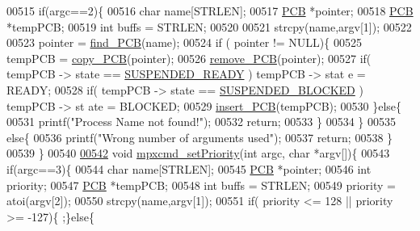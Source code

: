 \begin{DoxyCode}
{{00515         \textcolor{keywordflow}{if}(argc==2)\{
00516                 \textcolor{keywordtype}{char} name[STRLEN];
00517                 \hyperlink{structprocess}{PCB} *pointer;
00518                 \hyperlink{structprocess}{PCB} *tempPCB;
00519                 \textcolor{keywordtype}{int} buffs = STRLEN;
00520                 
00521                 strcpy(name,argv[1]);
00522                 
00523                 pointer = \hyperlink{mpx__r2_8c_a612a6abcb66c688a32f33abc93ff3990}{find_PCB}(name);
00524                 \textcolor{keywordflow}{if} ( pointer != NULL)\{
00525                         tempPCB = \hyperlink{mpx__r2_8c_aca3ad02d2b4c68f7653b0adf2c484ff6}{copy_PCB}(pointer);
00526                         \hyperlink{mpx__r2_8c_af30a3658210d449b4b53e5be2ed2bc2e}{remove_PCB}(pointer);
00527                         \textcolor{keywordflow}{if}( tempPCB -> state == \hyperlink{mpx__r2_8h_a07b1141143e8825b04670da23fca8cc7}{SUSPENDED_READY} ) tempPCB -> stat
      e = READY;
00528                         \textcolor{keywordflow}{if}( tempPCB -> state == \hyperlink{mpx__r2_8h_a6e41bb5a80c5049e8d364bab8ee4d73a}{SUSPENDED_BLOCKED} ) tempPCB -> st
      ate = BLOCKED;
00529                         \hyperlink{mpx__r2_8c_aa3b334e3a5afd6e590917667ad359a6f}{insert_PCB}(tempPCB);
00530                 \}\textcolor{keywordflow}{else}\{
00531                         printf(\textcolor{stringliteral}{"Process Name not found!"});
00532                         \textcolor{keywordflow}{return};
00533                 \}
00534         \}
00535         \textcolor{keywordflow}{else}\{
00536                 printf(\textcolor{stringliteral}{"Wrong number of arguments used"});       
00537                 \textcolor{keywordflow}{return};
00538         \}
00539 \}
00540 
\hypertarget{mpx__r2_8c_source_l00542}{}\hyperlink{mpx__r2_8h_a4505a685b9ab69940541dc4e973e0f01}{00542} \textcolor{keywordtype}{void} \hyperlink{mpx__r2_8c_a4505a685b9ab69940541dc4e973e0f01}{mpxcmd_setPriority}(\textcolor{keywordtype}{int} argc, \textcolor{keywordtype}{char} *argv[])\{ 
00543         \textcolor{keywordflow}{if}(argc==3)\{
00544                 \textcolor{keywordtype}{char} name[STRLEN];
00545                 \hyperlink{structprocess}{PCB} *pointer;
00546                 \textcolor{keywordtype}{int} priority;
00547                 \hyperlink{structprocess}{PCB} *tempPCB;
00548                 \textcolor{keywordtype}{int} buffs = STRLEN;
00549                 priority  = atoi(argv[2]);
00550                 strcpy(name,argv[1]);
00551                 \textcolor{keywordflow}{if}( priority <= 128 || priority >= -127)\{ ;\}\textcolor{keywordflow}{else}\{
}}
\end{DoxyCode}
